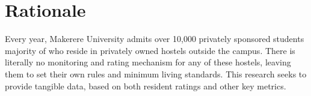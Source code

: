 \chapter{Rationale}

Every year, Makerere University admits over 10,000 privately sponsored students majority of who reside in privately owned hostels outside the campus. There is literally no monitoring and rating mechanism for any of these hostels, leaving them to set their own rules and minimum living standards.
This research seeks to provide tangible data, based on both resident ratings and other key metrics.